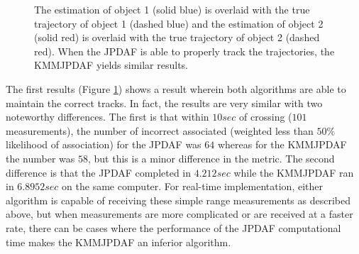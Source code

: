 \documentclass[letterpaper, 10pt, conference]{ieeeconf}
\begin{document}
\begin{figure}
\centerline{
	}
\centerline{
	}
\caption{The estimation of object 1 (solid blue) is overlaid with the true trajectory of object 1 (dashed blue) and the estimation of object 2 (solid red) is overlaid with the true trajectory of object 2 (dashed red). When the JPDAF is able to properly track the trajectories, the KMMJPDAF yields similar results.}	
\label{Case1}
\end{figure}

The first results (Figure \ref{Case1}) shows a result wherein both algorithms are able to maintain the correct tracks. In fact, the results are very similar with two noteworthy differences. The first is that within $10 sec$ of crossing ($101$ measurements), the number of incorrect associated (weighted less than $50\%$ likelihood of association) for the JPDAF was $64$ whereas for the KMMJPDAF the number was $58$, but this is a minor difference in the metric. The second difference is that the JPDAF completed in $4.212sec$ while the KMMJPDAF ran in $6.8952sec$ on the same computer. For real-time implementation, either algorithm is capable of receiving these simple range measurements as described above, but when measurements are more complicated or are received at a faster rate, there can be cases where the performance of the JPDAF computational time makes the KMMJPDAF an inferior algorithm.
\end{document}
